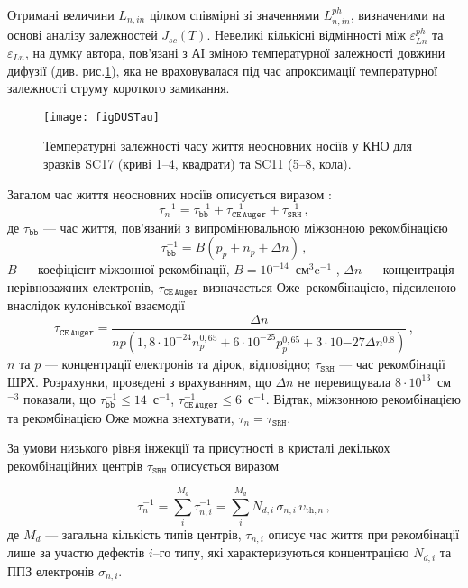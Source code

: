 Отримані величини $L_{n,in}$ цілком співмірні зі значеннями $L_{n,in}^{ph}$, визначеними на основі аналізу залежностей $J_{sc}(T)$.
Невеликі кількісні відмінності між $\varepsilon_{L n}^{ph}$ та $\varepsilon_{L n}$,
на думку автора, пов'язані з АІ зміною температурної залежності довжини дифузії (див. рис.\ref{figDUSTau}),
яка не враховувалася під час апроксимації температурної залежності струму короткого замикання.


\begin{figure}
\center
\texttt{[image: figDUSTau]}%
\caption{\label{figDUSTau}
Температурні залежності часу життя неосновних носіїв у КНО
для зразків SC17 (криві 1--4, квадрати) та SC11 (5--8, кола).
\FigCaptionSSC
}%
\end{figure}

Загалом час життя неосновних носіїв описується виразом \cite{MurphyJAP2011}:
\begin{equation}
\label{eqTAUsum}
\tau_n^{-1}=\tau_\mathtt{bb}^{-1}+\tau_\mathtt{CE\,Auger}^{-1}+\tau_\mathtt{SRH}^{-1}\,,
\end{equation}
де
$\tau_\mathtt{bb}$ --- час життя, пов'язаний з випромінювальною міжзонною рекомбінацією
\begin{equation}
\label{eqTAUbb}
\tau_\mathtt{bb}^{-1}=B(p_p+n_p+\Delta n)\,,
\end{equation}
$B$ --- коефіцієнт міжзонної рекомбінації, $B=10^{-14}$~см$^3$c$^{-1}$ \cite{Si:TAUbb,MurphyJAP2011},
$\Delta n$ --- концентрація нерівноважних електронів,
$\tau_\mathtt{CE\,Auger}$ визначається Оже--рекомбінацією, підсиленою внаслідок кулонівської взаємодії  \cite{Si:TAUAuger}
\begin{equation}
\label{eqTAAuger}
\tau_\mathtt{CE\,Auger}=\frac{\Delta n}{np\left(1,8\cdot10^{-24}n_p^{0,65}+6\cdot10^{-25}p_p^{0,65}+3\cdot10{-27}\Delta n^{0.8}\right)}\,,
\end{equation}
$n$ та $p$ --- концентрації електронів та дірок, відповідно;
$\tau_\mathtt{SRH}$ --- час рекомбінації ШРХ.
Розрахунки, проведені з врахуванням, що
$\Delta n$ не перевищувала $8\cdot10^{13}$~см$^{-3}$
показали, що $\tau_\mathtt{bb}^{-1}\leq14$~с$^{-1}$, $\tau_\mathtt{CE\,Auger}^{-1}\leq6$~с$^{-1}$.
Відтак, міжзонною рекомбінацією та рекомбінацією Оже можна знехтувати, $\tau_n=\tau_\mathtt{SRH}$.

За умови низького рівня інжекції та присутності в кристалі декількох рекомбінаційних центрів $\tau_\mathtt{SRH}$ описується виразом

\begin{equation}
\label{eqTAUSHRsum}
\tau_n^{-1}=\sum_i^{M_d}\tau_{n,i}^{-1}=\sum_i^{M_d}N_{d,i}\,\sigma_{n,i}\,\upsilon_{\mathrm{th},n}\,,
\end{equation}
де
$M_d$ --- загальна кількість типів центрів,
$\tau_{n,i}$ описує час життя при рекомбінації лише за участю дефектів $i$--го типу,
які характеризуються концентрацією $N_{d,i}$ та ППЗ електронів $\sigma_{n,i}$.

